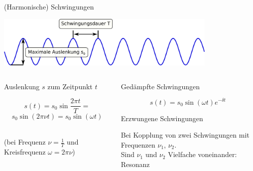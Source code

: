 \documentclass{beamer}
\begin{document}
\begin{frame}{(Harmonische) Schwingungen}

\begin{center}

\includegraphics[width=0.8\textwidth]{schwingungen_groessen.png}
\end{center}


\begin{columns}[c]

\begin{column}{5cm}


\pause

Auslenkung \(s\) zum Zeitpunkt \(t\)

\[
s(t) = s_0\sin\frac{2\pi t}{T} =  \]
\[
s_0\sin (2\pi\nu t) = s_0 \sin (\omega t)
\]

$\,$\\[0.2 cm]

(bei Frequenz \(\nu = \frac{1}{T}\) und Kreisfrequenz \(\omega = 2\pi\nu\))

\end{column}

\begin{column}{5cm}

\pause
\begin{block}{Gedämpfte Schwingungen}

\[
s(t) = s_0 \sin (\omega t)  e^{-\delta t}
\]


\end{block}

\pause

\begin{block}{Erzwungene Schwingungen}

Bei Kopplung von zwei Schwingungen mit Frequenzen \(\nu_1\), \(\nu_2\). \\ Sind \(\nu_1\) und \(\nu_2\) Vielfache voneinander: Resonanz

\end{block}

\end{column}


\end{columns}


    
\end{frame}
\end{document}
